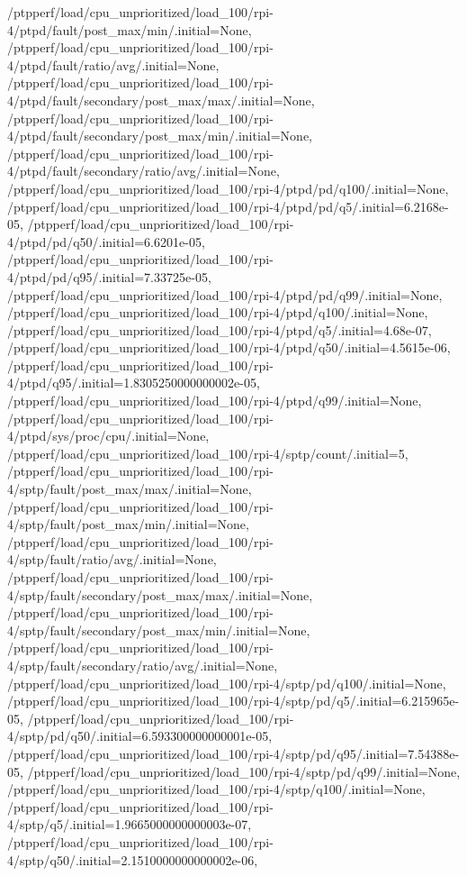 {    /ptpperf/load/cpu_unprioritized/load_100/rpi-4/ptpd/fault/post_max/min/.initial=None,
    /ptpperf/load/cpu_unprioritized/load_100/rpi-4/ptpd/fault/ratio/avg/.initial=None,
    /ptpperf/load/cpu_unprioritized/load_100/rpi-4/ptpd/fault/secondary/post_max/max/.initial=None,
    /ptpperf/load/cpu_unprioritized/load_100/rpi-4/ptpd/fault/secondary/post_max/min/.initial=None,
    /ptpperf/load/cpu_unprioritized/load_100/rpi-4/ptpd/fault/secondary/ratio/avg/.initial=None,
    /ptpperf/load/cpu_unprioritized/load_100/rpi-4/ptpd/pd/q100/.initial=None,
    /ptpperf/load/cpu_unprioritized/load_100/rpi-4/ptpd/pd/q5/.initial=6.2168e-05,
    /ptpperf/load/cpu_unprioritized/load_100/rpi-4/ptpd/pd/q50/.initial=6.6201e-05,
    /ptpperf/load/cpu_unprioritized/load_100/rpi-4/ptpd/pd/q95/.initial=7.33725e-05,
    /ptpperf/load/cpu_unprioritized/load_100/rpi-4/ptpd/pd/q99/.initial=None,
    /ptpperf/load/cpu_unprioritized/load_100/rpi-4/ptpd/q100/.initial=None,
    /ptpperf/load/cpu_unprioritized/load_100/rpi-4/ptpd/q5/.initial=4.68e-07,
    /ptpperf/load/cpu_unprioritized/load_100/rpi-4/ptpd/q50/.initial=4.5615e-06,
    /ptpperf/load/cpu_unprioritized/load_100/rpi-4/ptpd/q95/.initial=1.8305250000000002e-05,
    /ptpperf/load/cpu_unprioritized/load_100/rpi-4/ptpd/q99/.initial=None,
    /ptpperf/load/cpu_unprioritized/load_100/rpi-4/ptpd/sys/proc/cpu/.initial=None,
    /ptpperf/load/cpu_unprioritized/load_100/rpi-4/sptp/count/.initial=5,
    /ptpperf/load/cpu_unprioritized/load_100/rpi-4/sptp/fault/post_max/max/.initial=None,
    /ptpperf/load/cpu_unprioritized/load_100/rpi-4/sptp/fault/post_max/min/.initial=None,
    /ptpperf/load/cpu_unprioritized/load_100/rpi-4/sptp/fault/ratio/avg/.initial=None,
    /ptpperf/load/cpu_unprioritized/load_100/rpi-4/sptp/fault/secondary/post_max/max/.initial=None,
    /ptpperf/load/cpu_unprioritized/load_100/rpi-4/sptp/fault/secondary/post_max/min/.initial=None,
    /ptpperf/load/cpu_unprioritized/load_100/rpi-4/sptp/fault/secondary/ratio/avg/.initial=None,
    /ptpperf/load/cpu_unprioritized/load_100/rpi-4/sptp/pd/q100/.initial=None,
    /ptpperf/load/cpu_unprioritized/load_100/rpi-4/sptp/pd/q5/.initial=6.215965e-05,
    /ptpperf/load/cpu_unprioritized/load_100/rpi-4/sptp/pd/q50/.initial=6.593300000000001e-05,
    /ptpperf/load/cpu_unprioritized/load_100/rpi-4/sptp/pd/q95/.initial=7.54388e-05,
    /ptpperf/load/cpu_unprioritized/load_100/rpi-4/sptp/pd/q99/.initial=None,
    /ptpperf/load/cpu_unprioritized/load_100/rpi-4/sptp/q100/.initial=None,
    /ptpperf/load/cpu_unprioritized/load_100/rpi-4/sptp/q5/.initial=1.9665000000000003e-07,
    /ptpperf/load/cpu_unprioritized/load_100/rpi-4/sptp/q50/.initial=2.1510000000000002e-06,
}
